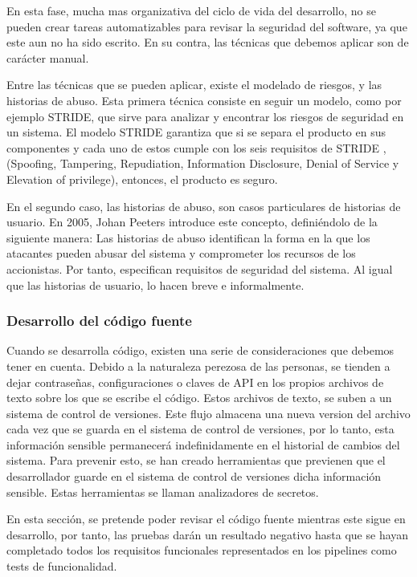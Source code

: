 \documentclass[12pt]{report} %
\begin{document}
En esta fase, mucha mas organizativa del ciclo de vida del desarrollo, no se
pueden crear tareas automatizables para revisar la seguridad del software, ya
que este aun no ha sido escrito.  En su contra, las técnicas que debemos aplicar
son de carácter manual.

Entre las técnicas que se pueden aplicar, existe el modelado de riesgos, y las
historias de abuso.  Esta primera técnica consiste en seguir un modelo, como por
ejemplo \gls{STRIDE}, que sirve para analizar y encontrar los riesgos de
seguridad en un sistema.  El modelo \gls{STRIDE} garantiza que si se separa el
producto en sus componentes y cada uno de estos cumple con los seis requisitos
de \gls{STRIDE} \cite{Loren1999}, (Spoofing, Tampering, Repudiation, Information
Disclosure, Denial of Service y Elevation of privilege), entonces, el producto
es seguro.

En el segundo caso, las historias de abuso, son casos particulares de historias
de usuario.  En 2005, Johan Peeters introduce este concepto, definiéndolo de la
siguiente manera: Las historias de abuso identifican la forma en la que los
atacantes pueden abusar del sistema y comprometer los recursos de los
accionistas.  Por tanto, especifican requisitos de seguridad del sistema.  Al
igual que las historias de usuario, lo hacen breve e informalmente.
\cite{Peeters2005}

\subsubsection{Desarrollo del código fuente}
 
Cuando se desarrolla código, existen una serie de consideraciones que debemos
tener en cuenta.  Debido a la naturaleza perezosa de las personas, se tienden a
dejar contraseñas, configuraciones o claves de \gls{API} en los propios archivos
de texto sobre los que se escribe el código.  Estos archivos de texto, se suben
a un sistema de control de versiones.  Este flujo almacena una nueva version del
archivo cada vez que se guarda en el sistema de control de versiones, por lo
tanto, esta información sensible permanecerá indefinidamente en el historial de
cambios del sistema.  Para prevenir esto, se han creado herramientas que
previenen que el desarrollador guarde en el sistema de control de versiones
dicha información sensible.  Estas herramientas se llaman analizadores de
secretos.

En esta sección, se pretende poder revisar el código fuente mientras este sigue
en desarrollo, por tanto, las pruebas darán un resultado negativo hasta que se
hayan completado todos los requisitos funcionales representados en los pipelines
como tests de funcionalidad.
\end{document}
